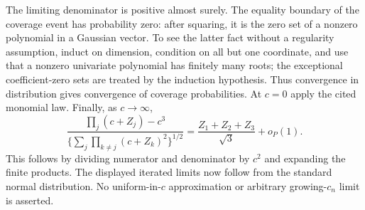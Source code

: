 The limiting denominator is positive almost surely. The equality boundary of the coverage event has probability zero: after squaring, it is the zero set of a nonzero polynomial in a Gaussian vector. To see the latter fact without a regularity assumption, induct on dimension, condition on all but one coordinate, and use that a nonzero univariate polynomial has finitely many roots; the exceptional coefficient-zero sets are treated by the induction hypothesis. Thus convergence in distribution gives convergence of coverage probabilities. At $c=0$ apply the cited monomial law. Finally, as $c\to\infty$,
\[
 \frac{\prod_j(c+Z_j)-c^3}
 {\{\sum_j\prod_{k\ne j}(c+Z_k)^2\}^{1/2}}
 =\frac{Z_1+Z_2+Z_3}{\sqrt3}+o_P(1).
\]
This follows by dividing numerator and denominator by $c^2$ and expanding the finite products. The displayed iterated limits now follow from the standard normal distribution. No uniform-in-$c$ approximation or arbitrary growing-$c_n$ limit is asserted.
